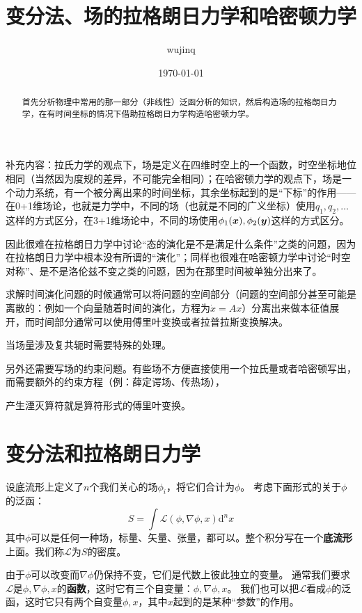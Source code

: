 \documentclass[UTF8, a4paper]{ctexart}
\title{变分法、场的拉格朗日力学和哈密顿力学}
\author{wujinq}
\date{\today}
\begin{document}
\maketitle

\begin{abstract}
    首先分析物理中常用的那一部分（非线性）泛函分析的知识，然后构造场的拉格朗日力学，在有时间坐标的情况下借助拉格朗日力学构造哈密顿力学。
\end{abstract}

补充内容：拉氏力学的观点下，场是定义在四维时空上的一个函数，时空坐标地位相同（当然因为度规的差异，不可能完全相同）；在哈密顿力学的观点下，场是一个动力系统，有一个被分离出来的时间坐标，其余坐标起到的是“下标”的作用——在0+1维场论，也就是力学中，不同的场（也就是不同的广义坐标）使用$q_1, q_2, \ldots$这样的方式区分，在3+1维场论中，不同的场使用$\phi_1(\vb*{x}), \phi_2(\vb*{y})$这样的方式区分。

因此很难在拉格朗日力学中讨论“态的演化是不是满足什么条件”之类的问题，因为在拉格朗日力学中根本没有所谓的“演化”；同样也很难在哈密顿力学中讨论“时空对称”、是不是洛伦兹不变之类的问题，因为在那里时间被单独分出来了。

求解时间演化问题的时候通常可以将问题的空间部分（问题的空间部分甚至可能是离散的：例如一个向量随着时间的演化，方程为$\dot{x} = Ax$）分离出来做本征值展开，而时间部分通常可以使用傅里叶变换或者拉普拉斯变换解决。

当场量涉及复共轭时需要特殊的处理。

另外还需要写场的约束问题。有些场不方便直接使用一个拉氏量或者哈密顿写出，而需要额外的约束方程（例：薛定谔场、传热场），

产生湮灭算符就是算符形式的傅里叶变换。

\section{变分法和拉格朗日力学}

设底流形上定义了$n$个我们关心的场$\phi_i$，将它们合计为$\phi$。
考虑下面形式的关于$\phi$的泛函：
\begin{equation}
    S = \int \mathcal{L}(\phi, \nabla \phi, x) \mathrm{d}^n x 
    \label{eq:action-def}
\end{equation}
其中$\phi$可以是任何一种场，标量、矢量、张量，都可以。整个积分写在一个\textbf{底流形}上面。我们称$\mathcal{L}$为$S$的密度。

由于$\phi$可以改变而$\nabla \phi$仍保持不变，它们是代数上彼此独立的变量。
通常我们要求$\mathcal{L}$是$\phi, \nabla \phi, x$的\textbf{函数}，这时它有三个自变量：$\phi, \nabla \phi, x$。
我们也可以把$\mathcal{L}$看成$\phi$的泛函，这时它只有两个自变量$\phi,x$，其中$x$起到的是某种“参数”的作用。
\end{document}
